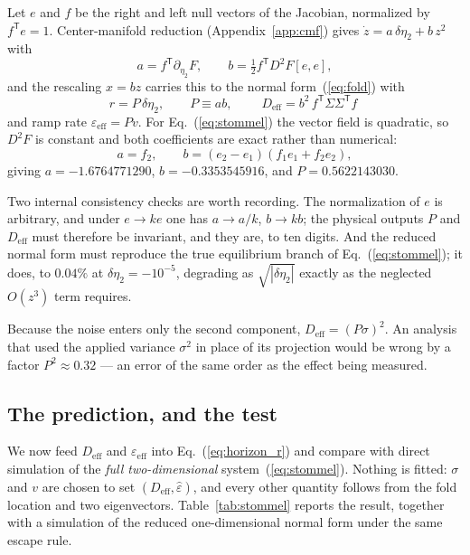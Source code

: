 \documentclass[%
 twocolumn,
 superscriptaddress,
 amsmath,amssymb,
 aps,
 pre,
 floatfix,
]{revtex4-2}
\newcommand{\Sig}{\hat\varepsilon}
\begin{document}
Let $e$ and $f$ be the right and left null vectors of the Jacobian, normalized by $f^{\mathsf T}e=1$.  Center-manifold reduction (Appendix~\ref{app:cmf}) gives $\dot z=a\,\delta\eta_2+b\,z^2$ with
\begin{equation}
\label{eq:ab}
a=f^{\mathsf T}\partial_{\eta_2}F,\qquad b=\tfrac12 f^{\mathsf T}D^2F[e,e],
\end{equation}
and the rescaling $x=bz$ carries this to the normal form~(\ref{eq:fold}) with
\begin{equation}
\label{eq:reduction}
r=P\,\delta\eta_2,\qquad P\equiv ab,\qquad
\boxed{\;D_{\mathrm{eff}}=b^2\,f^{\mathsf T}\Sigma\Sigma^{\mathsf T}f\;}
\end{equation}
and ramp rate $\varepsilon_{\mathrm{eff}}=Pv$.  For Eq.~(\ref{eq:stommel}) the vector field is quadratic, so $D^2F$ is constant and both coefficients are exact rather than numerical:
\begin{equation}
a=f_2,\qquad b=(e_2-e_1)(f_1e_1+f_2e_2),
\end{equation}
giving $a=-1.6764771290$, $b=-0.3353545916$, and $P=0.5622143030$.

Two internal consistency checks are worth recording.  The normalization of $e$ is arbitrary, and under $e\to ke$ one has $a\to a/k$, $b\to kb$; the physical outputs $P$ and $D_{\mathrm{eff}}$ must therefore be invariant, and they are, to ten digits.  And the reduced normal form must reproduce the true equilibrium branch of Eq.~(\ref{eq:stommel}); it does, to $0.04\%$ at $\delta\eta_2=-10^{-5}$, degrading as $\sqrt{|\delta\eta_2|}$ exactly as the neglected $O(z^3)$ term requires.

Because the noise enters only the second component, $D_{\mathrm{eff}}=(P\sigma)^2$.  An analysis that used the applied variance $\sigma^2$ in place of its projection would be wrong by a factor $P^2\approx0.32$ --- an error of the same order as the effect being measured.

\subsection{The prediction, and the test}

We now feed $D_{\mathrm{eff}}$ and $\varepsilon_{\mathrm{eff}}$ into Eq.~(\ref{eq:horizon_r}) and compare with direct simulation of the \emph{full two-dimensional} system~(\ref{eq:stommel}).  Nothing is fitted: $\sigma$ and $v$ are chosen to set $(D_{\mathrm{eff}},\Sig)$, and every other quantity follows from the fold location and two eigenvectors.  Table~\ref{tab:stommel} reports the result, together with a simulation of the reduced one-dimensional normal form under the same escape rule.
\end{document}
